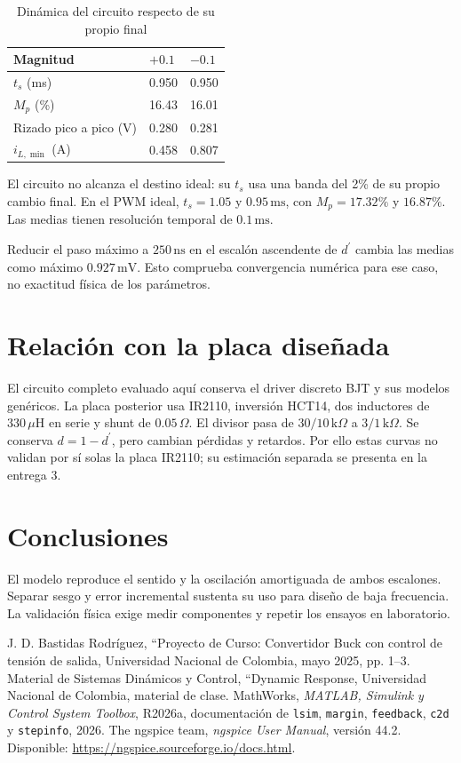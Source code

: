 \documentclass[conference,letterpaper]{IEEEtran}
\begin{document}
\begin{table}[H]\caption{Dinámica del circuito respecto de su propio final}\label{tab:open-dynamics}\centering\footnotesize\setlength{\tabcolsep}{2pt}\renewcommand{\arraystretch}{1.18}\begin{tabularx}{\columnwidth}{LYY}\toprule
Magnitud & $+0.1$ & $-0.1$\\\midrule
$t_s$ (ms) & 0.950 & 0.950\\
$M_p$ (\%) & 16.43 & 16.01\\
Rizado pico a pico (V) & 0.280 & 0.281\\
$i_{L,\min}$ (A) & 0.458 & 0.807\\\bottomrule\end{tabularx}\end{table}
El circuito no alcanza el destino ideal: su $t_s$ usa una banda del 2\% de su propio cambio final. En el PWM ideal, $t_s=1.05$ y $0.95\,\mathrm{ms}$, con $M_p=17.32\%$ y $16.87\%$. Las medias tienen resolución temporal de $0.1\,\mathrm{ms}$.

Reducir el paso máximo a $250\,\mathrm{ns}$ en el escalón ascendente de $d^{\prime}$ cambia las medias como máximo $0.927\,\mathrm{mV}$. Esto comprueba convergencia numérica para ese caso, no exactitud física de los parámetros.

\section{Relación con la placa diseñada}
El circuito completo evaluado aquí conserva el driver discreto BJT y sus modelos genéricos. La placa posterior usa IR2110, inversión HCT14, dos inductores de $330\,\mu\mathrm{H}$ en serie y shunt de $0.05\,\Omega$. El divisor pasa de $30/10\,\mathrm{k}\Omega$ a $3/1\,\mathrm{k}\Omega$. Se conserva $d=1-d^{\prime}$, pero cambian pérdidas y retardos. Por ello estas curvas no validan por sí solas la placa IR2110; su estimación separada se presenta en la entrega 3.

\section{Conclusiones}
El modelo reproduce el sentido y la oscilación amortiguada de ambos escalones. Separar sesgo y error incremental sustenta su uso para diseño de baja frecuencia. La validación física exige medir componentes y repetir los ensayos en laboratorio.

\begin{thebibliography}{9}
J. D. Bastidas Rodríguez, ``Proyecto de Curso: Convertidor Buck con control de tensión de salida, Universidad Nacional de Colombia, mayo 2025, pp. 1--3.
Material de Sistemas Dinámicos y Control, ``Dynamic Response, Universidad Nacional de Colombia, material de clase.
MathWorks, \emph{MATLAB, Simulink y Control System Toolbox}, R2026a, documentación de \texttt{lsim}, \texttt{margin}, \texttt{feedback}, \texttt{c2d} y \texttt{stepinfo}, 2026.
The ngspice team, \emph{ngspice User Manual}, versión 44.2. Disponible: \url{https://ngspice.sourceforge.io/docs.html}.
\end{thebibliography}
\end{document}
